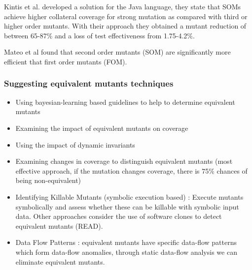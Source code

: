 \begin{itemize}
	Kintis et al. \cite{kintis2010evaluating} developed a solution for the Java language, they state that SOMs achieve higher collateral coverage for strong mutation as compared with third or higher order mutants. With their approach they obtained a mutant reduction of between 65-87\% and a loss of test effectiveness from 1.75-4.2\%.

	Mateo et al \cite{mateo2012validating,madeyski2013overcoming} found that second order mutants (SOM) are significantly more efficient that first order mutants (FOM).

\end{itemize}	

\subsubsection{Suggesting equivalent mutants techniques}

\begin{itemize}
	\item Using bayesian-learning based guidelines to help to determine equivalent mutants \cite{maldonado2005bayesian}
	\item Examining the impact of equivalent mutants on coverage \cite{grun2009impact}
	\item Using the impact of dynamic invariants \cite{schuler2009efficient}
	\item Examining changes in coverage to distinguish equivalent mutants \cite{schuler2010covering,schuler2013covering} (most effective approach, if the mutation changes coverage, there is 75\% chances of being non-equivalent)
	\item Identifying Killable Mutants (symbolic execution based) \cite{papadakis2012mutation, holling2016nequivack}: Execute mutants symbolically and assess whether these can be killable with symbolic input data. 
	Other approaches consider the use of software clones to detect equivalent mutants \cite{kintis2013identifying} (READ).
	\item Data Flow Patterns \cite{kintis2014using,kintis2015medic}: equivalent mutants have specific data-flow patterns which form data-flow anomalies, through static data-flow analysis we can eliminate equivalent mutants.
\end{itemize}


